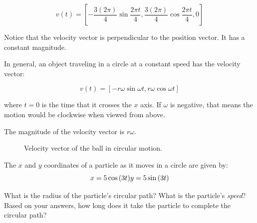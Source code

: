 $$v(t) = \left[ -\frac{3 (2\pi)}{4} \sin{\frac{2\pi t}{4}}, \frac{3(2\pi)}{4} \cos{\frac{2\pi t}{4}}, 0 \right]$$

Notice that the velocity vector is perpendicular to the position vector.  It has a constant magnitude.

In general, an object traveling in a circle at a constant speed has the velocity vector:

$$v(t) = \left[ -r\omega \sin{\omega t}, r\omega \cos{\omega t}\right]$$

where $t = 0$ is the time that it crosses the $x$ axis.  If $\omega$ is
negative, that means the motion would be clockwise when viewed from
above.

The magnitude of the velocity vector is $r\omega$. 
\begin{figure}[htbp]
\begin{center}
    
    
\end{center}    \caption{Velocity vector of the ball in circular motion.}
    \label{fig:billardBallVelocity}
\end{figure}

\begin{Exercise} The $x$ and $y$ coordinates of a particle as it moves in a circle are given by:
$$x = 5\cos{\left( 3t \right)}\\
y = 5\sin{\left( 3t \right)}$$

What is the radius of the particle's circular path? What is the particle's \textit{speed}? Based on your answers, how long does it take the particle to complete the circular path?
\vspace{50mm}
\end{Exercise}

